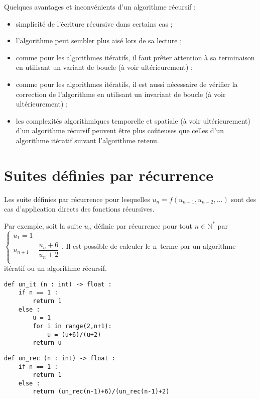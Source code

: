  
Quelques  avantages et inconvénients d'un algorithme récursif :
\begin{itemize}
\item simplicité de l'écriture récursive dans certains cas ;
\item l'algorithme peut sembler plus aisé lors de sa lecture ;
\item comme pour les algorithmes itératifs, il faut prêter attention à sa terminaison en utilisant un variant de boucle (à voir ultérieurement) ;
\item comme pour les algorithmes itératifs, il est aussi nécessaire de vérifier la correction de l'algorithme en utilisant un invariant de boucle (à voir ultérieurement) ;
\item les complexités algorithmiques temporelle et spatiale (à voir ultérieurement) d'un algorithme récursif peuvent être plus coûteuses que celles d'un algorithme itératif suivant l'algorithme retenu.
\end{itemize}




\section{Suites définies par récurrence}

Les suite définies par récurrence pour lesquelles $u_{n}=f\left(u_{n-1},u_{n-2},...\right)$ sont des cas d'application directs des fonctions récursives. 

Par exemple, soit la suite $u_n$ définie par récurrence pour tout $n\in\mathbb{N}^*$ par 
$
\left\{
\begin{array}{ll} 
u_1 = 1 \\
u_{n+1} = \dfrac{u_n + 6}{u_n + 2} \\
\end{array}
\right.
$. Il est possible de calculer le n\ieme \, terme par un algorithme itératif ou un algorithme récursif. 

\noindent\begin{minipage}[c]{.45\linewidth}
\begin{lstlisting}
def un_it (n : int) -> float :
    if n == 1 :
        return 1
    else : 
        u = 1
        for i in range(2,n+1):
            u = (u+6)/(u+2)
        return u
\end{lstlisting}
\end{minipage} \hfill
\begin{minipage}[c]{.5\linewidth}
\begin{lstlisting}
def un_rec (n : int) -> float :
    if n == 1 :
        return 1
    else : 
        return (un_rec(n-1)+6)/(un_rec(n-1)+2)
\end{lstlisting}
\end{minipage} 

